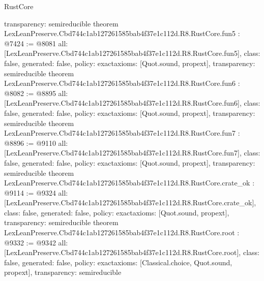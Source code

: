 \begin{lexlean}{RustCore}
\begin{coremodule}
{  transparency: semireducible
}
theorem LexLeanPreserve.Cbd744c1ab127261585bab4f37e1c112d.R8.RustCore.fun5 : @7424 := @8081 {
  all: [LexLeanPreserve.Cbd744c1ab127261585bab4f37e1c112d.R8.RustCore.fun5],
  class: false,
  generated: false,
  policy: exact{axioms: [Quot.sound, propext]},
  transparency: semireducible
}
theorem LexLeanPreserve.Cbd744c1ab127261585bab4f37e1c112d.R8.RustCore.fun6 : @8082 := @8895 {
  all: [LexLeanPreserve.Cbd744c1ab127261585bab4f37e1c112d.R8.RustCore.fun6],
  class: false,
  generated: false,
  policy: exact{axioms: [Quot.sound, propext]},
  transparency: semireducible
}
theorem LexLeanPreserve.Cbd744c1ab127261585bab4f37e1c112d.R8.RustCore.fun7 : @8896 := @9110 {
  all: [LexLeanPreserve.Cbd744c1ab127261585bab4f37e1c112d.R8.RustCore.fun7],
  class: false,
  generated: false,
  policy: exact{axioms: [Quot.sound, propext]},
  transparency: semireducible
}
theorem LexLeanPreserve.Cbd744c1ab127261585bab4f37e1c112d.R8.RustCore.crate_ok : @9114 := @9324 {
  all: [LexLeanPreserve.Cbd744c1ab127261585bab4f37e1c112d.R8.RustCore.crate_ok],
  class: false,
  generated: false,
  policy: exact{axioms: [Quot.sound, propext]},
  transparency: semireducible
}
theorem LexLeanPreserve.Cbd744c1ab127261585bab4f37e1c112d.R8.RustCore.root : @9332 := @9342 {
  all: [LexLeanPreserve.Cbd744c1ab127261585bab4f37e1c112d.R8.RustCore.root],
  class: false,
  generated: false,
  policy: exact{axioms: [Classical.choice, Quot.sound, propext]},
  transparency: semireducible
}


\end{coremodule}
\end{lexlean}
